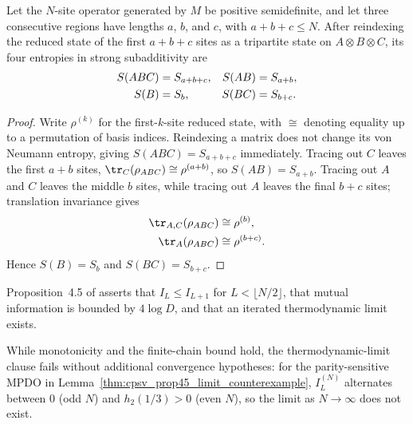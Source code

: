 \begin{lemma}
    \label{thm:mpdo_tripartite_block_entropy_identifications}
    \leanok
    Let the $N$-site operator generated by $M$ be positive semidefinite, and let
    three consecutive regions have lengths $a$, $b$, and $c$, with
    $a+b+c\leq N$. After reindexing the reduced state of the first $a+b+c$
    sites as a tripartite state on $A\otimes B\otimes C$, its four entropies in
    strong subadditivity are
    \begin{align}
        S(ABC) & =S_{a+b+c},      &
        S(AB)  & =S_{a+b}, \notag   \\
        S(B)   & =S_b,            &
        S(BC)  & =S_{b+c}.
        \notag
    \end{align}
\end{lemma}
\begin{proof}\leanok
    Write $\rho^{(k)}$ for the first-$k$-site reduced state, with $\cong$
    denoting equality up to a permutation of basis indices. Reindexing a
    matrix does not change its von Neumann entropy, giving
    $S(ABC)=S_{a+b+c}$ immediately. Tracing out $C$ leaves the first $a+b$
    sites, $\tr_C(\rho_{ABC})\cong\rho^{(a+b)}$, so
    $S(AB)=S_{a+b}$. Tracing out $A$ and $C$ leaves the middle $b$ sites,
    while tracing out $A$ leaves the final $b+c$ sites; translation invariance
    gives
    \begin{align}
        \tr_{A,C}(\rho_{ABC}) & \cong\rho^{(b)}, \notag \\
        \tr_A(\rho_{ABC})     & \cong\rho^{(b+c)}.
        \notag
    \end{align}
    Hence $S(B)=S_b$ and $S(BC)=S_{b+c}$.
\end{proof}

\begin{lemma}
    \label{thm:cpsv_prop45_printed_status}
    \notready
    Proposition~4.5 of \cite{Cirac2016MPDO_arXiv} asserts that
    $I_L\le I_{L+1}$ for $L<\lfloor N/2\rfloor$, that mutual information is
    bounded by $4\log D$, and that an iterated thermodynamic limit exists.

    While monotonicity and the finite-chain bound hold, the thermodynamic-limit
    clause fails without additional convergence hypotheses: for the
    parity-sensitive MPDO in Lemma~\ref{thm:cpsv_prop45_limit_counterexample},
    $I_L^{(N)}$ alternates between $0$ (odd $N$) and $h_2(1/3)>0$ (even $N$), so
    the limit as $N\to\infty$ does not exist.
\end{lemma}

